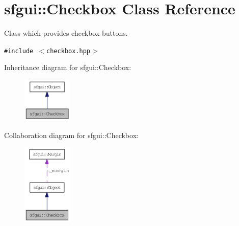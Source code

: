 \hypertarget{classsfgui_1_1Checkbox}{
\section{sfgui::Checkbox Class Reference}
\label{classsfgui_1_1Checkbox}
}
Class which provides checkbox buttons.  


{\tt \#include $<$checkbox.hpp$>$}

Inheritance diagram for sfgui::Checkbox:\nopagebreak
\begin{figure}[H]
\begin{center}
\leavevmode
\includegraphics[width=67pt]{classsfgui_1_1Checkbox__inherit__graph}
\end{center}
\end{figure}
Collaboration diagram for sfgui::Checkbox:\nopagebreak
\begin{figure}[H]
\begin{center}
\leavevmode
\includegraphics[width=68pt]{classsfgui_1_1Checkbox__coll__graph}
\end{center}
\end{figure}
